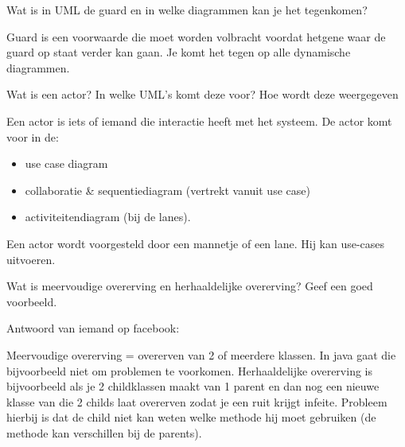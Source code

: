 \begin{question}
Wat is in UML de guard en in welke diagrammen kan je het tegenkomen?
\end{question}

\begin{solution}[print]
Guard is een voorwaarde die moet worden volbracht voordat hetgene waar de guard op staat verder kan gaan. Je komt het tegen op alle dynamische diagrammen.
\end{solution}

\begin{question}
Wat is een actor? In welke UML's komt deze voor? Hoe wordt deze weergegeven
\end{question}

\begin{solution}[print]

Een actor is iets of iemand die interactie heeft met het systeem.
De actor komt voor in de:
\begin{itemize}
\renewcommand\labelitemi{$\bullet$}
    \item use case diagram
    \item collaboratie \& sequentiediagram (vertrekt vanuit use case)
    \item activiteitendiagram (bij de lanes).
\end{itemize}

Een actor wordt voorgesteld door een mannetje of een lane. Hij kan use-cases uitvoeren.

\end{solution}

\begin{question}
Wat is meervoudige overerving en herhaaldelijke overerving? Geef een goed voorbeeld.
\end{question}

\begin{solution}[print]
Antwoord van iemand op facebook:

Meervoudige overerving = overerven van 2 of meerdere klassen. In java gaat die bijvoorbeeld niet om problemen te voorkomen. Herhaaldelijke overerving is bijvoorbeeld als je 2 childklassen maakt van 1 parent en dan nog een nieuwe klasse van die 2 childs laat overerven zodat je een ruit krijgt infeite. Probleem hierbij is dat de child niet kan weten welke methode hij moet gebruiken (de methode kan verschillen bij de parents).


\end{solution}

